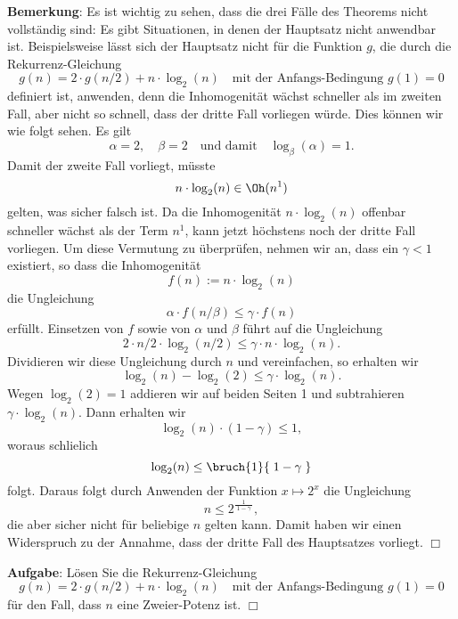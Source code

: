 \noindent
\textbf{Bemerkung}: Es ist wichtig zu sehen, dass die drei F\"alle des Theorems nicht vollst\"andig sind:
Es gibt Situationen, in denen der Hauptsatz nicht anwendbar ist.  Beispielsweise l\"asst sich der Hauptsatz nicht
f\"ur die Funktion $g$, die durch die Rekurrenz-Gleichung
\[ g(n) = 2 \cdot g(n/2) + n \cdot \log_2(n) \quad \mbox{mit der Anfangs-Bedingung $g(1) = 0$}\]
definiert ist, anwenden, denn die Inhomogenit\"at w\"achst schneller als im zweiten Fall, aber
nicht so schnell, dass der dritte Fall vorliegen w\"urde.  Dies k\"onnen wir wie folgt sehen.
Es gilt 
\[ \alpha = 2, \quad \beta = 2 \quad \mbox{und damit} \quad \log_\beta(\alpha) = 1. \]
Damit der zweite Fall vorliegt, m\"usste 
\[ n \cdot \log_2(n) \in \Oh(n^1) \]
gelten, was sicher falsch ist.  Da die Inhomogenit\"at $n \cdot \log_2(n)$ offenbar
schneller w\"achst als der Term $n^1$, kann jetzt h\"ochstens noch der dritte Fall vorliegen.
Um diese Vermutung zu \"uberpr\"ufen, nehmen wir an, dass ein $\gamma < 1$ existiert, so dass die Inhomogenit\"at 
\[ f(n) := n \cdot \log_2(n) \]
die Ungleichung 
\[ \alpha \cdot f(n/\beta) \leq \gamma \cdot f(n) \]
erf\"ullt.  Einsetzen von $f$ sowie von $\alpha$ und $\beta$ f\"uhrt auf die Ungleichung
\[ 2 \cdot n/2 \cdot \log_2(n/2) \leq \gamma \cdot n \cdot \log_2(n). \]
Dividieren wir diese Ungleichung durch $n$ und vereinfachen, so erhalten wir
\[ \log_2(n) - \log_2(2) \leq \gamma \cdot \log_2(n). \]
Wegen $\log_2(2) = 1$ addieren wir auf beiden Seiten 1 und subtrahieren $\gamma \cdot \log_2(n)$.
Dann erhalten wir
\[ \log_2(n) \cdot (1 - \gamma) \leq 1, \]
woraus schlie\3lich 
\[ \log_2(n) \leq \bruch{1}{\;1 - \gamma\;} \]
folgt.  Daraus folgt durch Anwenden der Funktion $x \mapsto 2^x$ die Ungleichung
\[ \displaystyle n \leq 2^\frac{1}{\;1 - \gamma\;}, \]
die aber sicher nicht f\"ur beliebige $n$ gelten kann.  Damit haben wir einen Widerspruch
zu der Annahme, dass der dritte Fall des Hauptsatzes vorliegt.
\hspace*{\fill} $\Box$
\vspace*{0.3cm}

\noindent
\textbf{Aufgabe}:  L\"osen Sie die Rekurrenz-Gleichung
\[ g(n) = 2 \cdot g(n/2) + n \cdot \log_2(n) \quad \mbox{mit der Anfangs-Bedingung $g(1) = 0$} \]
f\"ur den Fall, dass $n$ eine Zweier-Potenz ist.
\hspace*{\fill} $\Box$


